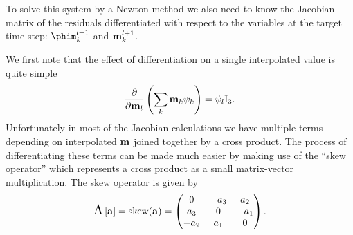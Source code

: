 To solve this system by a Newton method we also need to know the Jacobian matrix of the residuals differentiated with respect to the variables at the target time step: $\phim_\ik^{\tl+1}$ and $\mathbf{m}_{k}^{l+1}$.

We first note that the effect of differentiation on a single interpolated value is quite simple
\begin{equation}
  \frac{\partial }{\partial \mathbf{m}_l} \left( \sum_k \mathbf{m}_k {\psi_k} \right) = \psi_l \text{I}_3.
\end{equation}
Unfortunately in most of the Jacobian calculations we have multiple terms depending on interpolated $\mathbf{m}$ joined together by a cross product.
The process of differentiating these terms can be made much easier by making use of the ``skew operator'' which represents a cross product as a small matrix-vector multiplication.
The skew operator is given by
\begin{equation}
  \text{\Large{$\Lambda$}}\left[ {\mathbf{a}} \right] = \text{skew}({\mathbf{a}}) =
  \begin{pmatrix}
    0 & -a_3 & a_2 \\
    a_3 & 0 & -a_1 \\
    -a_2 & a_1 & 0
  \end{pmatrix}.
  \label{eqn:skew}
\end{equation}

